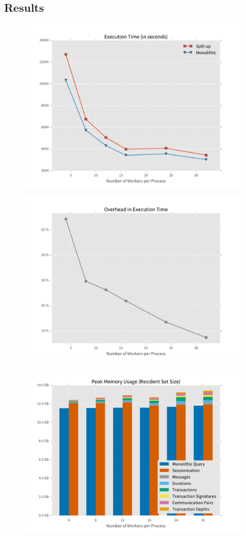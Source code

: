 \subsection{Results}

\begin{figure}[p]
  \centering
    \includegraphics[width=1\textwidth]{figures/evaluation/times}
\end{figure}

\begin{figure}[p]
  \centering
    \includegraphics[width=1\textwidth]{figures/evaluation/overhead}
\end{figure}

\begin{figure}[p]
  \centering
    \includegraphics[width=1\textwidth]{figures/evaluation/rss}
\end{figure}
